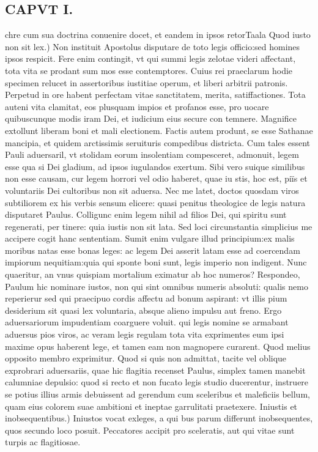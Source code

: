 \documentclass{article}
\begin{document}
\begin{pages}
\section*{CAPVT I. }
\marginpar{[ p.7 ]}\pstart chre cum sua doctrina conuenire docet, et eandem in ipsos retor\pend\pstart Taala Quod iusto non sit lex.) Non instituit Apostolus disputare de toto legis officio:sed homines ipsos respicit. Fere enim contingit, vt qui summi legis zelotae videri affectant, tota vita se prodant sum mos esse contemptores. Cuius rei praeclarum hodie specimen relucet in assertoribus iustitiae operum, et liberi arbitrii patronis. Perpetud in ore habent perfectam vitae sanctitatem, merita, satiffactiones. Tota auteni vita clamitat, eos plusquam impios et profanos esse, pro uocare quibuscunque modis iram Dei, et iudicium eius secure con temnere. Magnifice extollunt liberam boni et mali electionem. Factis autem produnt, se esse Sathanae mancipia, et quidem arctissimis seruituris compedibus districta. Cum tales essent Pauli aduersaril, vt stolidam eorum insolentiam compesceret, admonuit, legem esse qua si Dei gladium, ad ipsos iugulandos exertum. Sibi vero suique similibus non esse causam, cur legem horrori vel odio haberet, quae iu stis, hoc est, piïs et voluntariis Dei cultoribus non sit aduersa. Nec me latet, doctos quosdam viros subtiliorem ex his verbis sensum elicere: quasi penitus theologice de legis natura disputaret Paulus. Colligunc enim legem nihil ad filios Dei, qui spiritu sunt regenerati, per tinere: quia iustis non sit lata. Sed loci circunstantia simplicius me accipere cogit hanc sententiam. Sumit enim vulgare illud principium:ex malis moribus natas esse bonas leges: ac legem Dei asserit latam esse ad coercendam impiorum nequitiam:quia qui sponte boni sunt, legis imperio non indigent. Nunc quaeritur, an vnus quispiam mortalium eximatur ab hoc numeros? Respondeo, Paulum hic nominare iustos, non qui sint omnibus numeris absoluti: qualis nemo reperierur sed qui praecipuo cordis affectu ad bonum aspirant: vt illis pium desiderium sit quasi lex voluntaria, absque alieno impulsu aut freno. Ergo aduersariorum impudentiam coarguere voluit. qui legis nomine se armabant aduersus pios viros, ac veram legis regulam tota vita exprimentes eum ipsi maxime opus haberent lege, et tamen eam non magnopere curarent. Quod melius opposito membro exprimitur. Quod si quis non admittat, tacite vel oblique exprobrari aduersariis, quae hic flagitia recenset Paulus, simplex tamen manebit calumniae depulsio: quod si recto et non fucato legis studio ducerentur, instruere se potius illius armis debuissent ad gerendum cum sceleribus et maleficiis bellum, quam eius colorem suae ambitioni et ineptae garrulitati praetexere.  \pend\pstart Iniustis et inobsequentibus.) Iniustos vocat exleges, a qui bus parum differunt inobsequentes, quos secundo loco posuit. Peccatores accipit pro sceleratis, aut qui vitae sunt turpis ac flagitiosae.  \pend

\end{pages}
\end{document}
